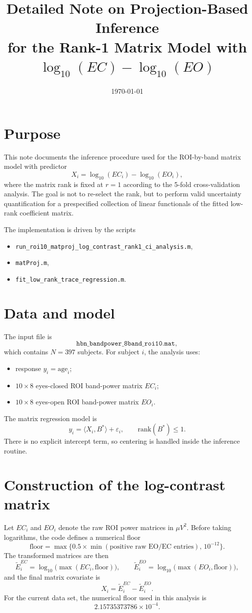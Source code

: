 \documentclass[11pt]{article}
\title{Detailed Note on Projection-Based Inference\\for the Rank-1 Matrix Model with $\log_{10}(EC)-\log_{10}(EO)$}
\author{}
\date{\today}
\begin{document}
\maketitle

\section{Purpose}
This note documents the inference procedure used for the ROI-by-band matrix model with predictor
\[
X_i=\log_{10}(EC_i)-\log_{10}(EO_i),
\]
where the matrix rank is fixed at \(r=1\) according to the 5-fold cross-validation analysis. The goal is not to re-select the rank, but to perform valid uncertainty quantification for a prespecified collection of linear functionals of the fitted low-rank coefficient matrix.

The implementation is driven by the scripts
\begin{itemize}[leftmargin=2em]
    \item \texttt{run\_roi10\_matproj\_log\_contrast\_rank1\_ci\_analysis.m},
    \item \texttt{matProj.m},
    \item \texttt{fit\_low\_rank\_trace\_regression.m}.
\end{itemize}

\section{Data and model}
The input file is
\[
\texttt{hbn\_bandpower\_8band\_roi10.mat},
\]
which contains \(N=397\) subjects. For subject \(i\), the analysis uses:
\begin{itemize}[leftmargin=2em]
    \item response \(y_i=\mathrm{age}_i\);
    \item \(10\times 8\) eyes-closed ROI band-power matrix \(EC_i\);
    \item \(10\times 8\) eyes-open ROI band-power matrix \(EO_i\).
\end{itemize}

The matrix regression model is
\[
y_i=\langle X_i,B^\ast\rangle+\varepsilon_i,\qquad \mathrm{rank}(B^\ast)\le 1.
\]
There is no explicit intercept term, so centering is handled inside the inference routine.

\section{Construction of the log-contrast matrix}
Let \(EC_i\) and \(EO_i\) denote the raw ROI power matrices in \(\mu V^2\). Before taking logarithms, the code defines a numerical floor
\[
\text{floor}
=
\max\bigl\{0.5\times \min(\text{positive raw EO/EC entries}),\,10^{-12}\bigr\}.
\]
The transformed matrices are then
\[
\widetilde E_i^{EC}=\log_{10}\!\bigl(\max(EC_i,\text{floor})\bigr),\qquad
\widetilde E_i^{EO}=\log_{10}\!\bigl(\max(EO_i,\text{floor})\bigr),
\]
and the final matrix covariate is
\[
X_i=\widetilde E_i^{EC}-\widetilde E_i^{EO}.
\]
For the current data set, the numerical floor used in this analysis is
\[
2.15735373786\times 10^{-4}.
\]
\end{document}

